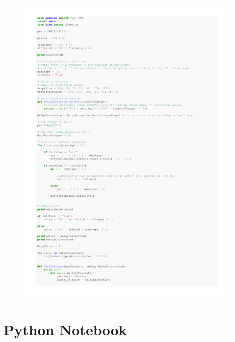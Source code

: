 \documentclass[%
 reprint,
 amsmath,amssymb,
 aps,
]{revtex4-2}
\begin{document}
    \begin{figure}[h]
        \includegraphics[width=\columnwidth,page=2]{Images/functionGenerator.pdf}
    \end{figure}


\clearpage
\section{Python Notebook}
\end{document}
